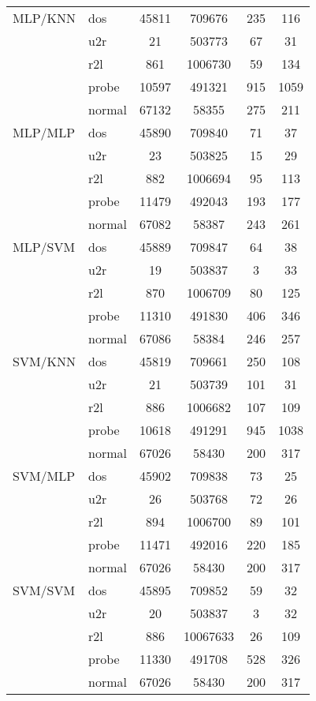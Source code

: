 \begin{longtable}{@{}llcccc@{}}
MLP/KNN & dos & 45811 & 709676 & 235 & 116 \\
 & u2r & 21 & 503773 & 67 & 31 \\
 & r2l & 861 & 1006730 & 59 & 134 \\
 & probe & 10597 & 491321 & 915 & 1059 \\
 & normal & 67132 & 58355 & 275 & 211 \\
MLP/MLP & dos & 45890 & 709840 & 71 & 37 \\
 & u2r & 23 & 503825 & 15 & 29 \\
 & r2l & 882 & 1006694 & 95 & 113 \\
 & probe & 11479 & 492043 & 193 & 177 \\
 & normal & 67082 & 58387 & 243 & 261 \\
MLP/SVM & dos & 45889 & 709847 & 64 & 38 \\
 & u2r & 19 & 503837 & 3 & 33 \\
 & r2l & 870 & 1006709 & 80 & 125 \\
 & probe & 11310 & 491830 & 406 & 346 \\
 & normal & 67086 & 58384 & 246 & 257 \\
SVM/KNN & dos & 45819 & 709661 & 250 & 108 \\
 & u2r & 21 & 503739 & 101 & 31 \\
 & r2l & 886 & 1006682 & 107 & 109 \\
 & probe & 10618 & 491291 & 945 & 1038 \\
 & normal & 67026 & 58430 & 200 & 317 \\
SVM/MLP & dos & 45902 & 709838 & 73 & 25 \\
 & u2r & 26 & 503768 & 72 & 26 \\
 & r2l & 894 & 1006700 & 89 & 101 \\
 & probe & 11471 & 492016 & 220 & 185 \\
 & normal & 67026 & 58430 & 200 & 317 \\
SVM/SVM & dos & 45895 & 709852 & 59 & 32 \\
 & u2r & 20 & 503837 & 3 & 32 \\
 & r2l & 886 & 10067633 & 26 & 109 \\
 & probe & 11330 & 491708 & 528 & 326 \\
 & normal & 67026 & 58430 & 200 & 317 \\ \bottomrule
\end{longtable}

